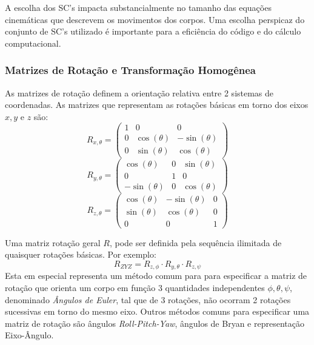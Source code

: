 A escolha dos SC's impacta substancialmente no tamanho das equações
cinemáticas que descrevem os movimentos dos corpos. Uma escolha perspicaz do conjunto de
SC's utilizado é importante para a eficiência do código e do cálculo
computacional.

\subsubsection{Matrizes de Rotação e Transformação Homogênea}

As matrizes de rotação definem a orientação relativa entre 2 sistemas de
coordenadas. As matrizes que representam as rotações básicas em torno
dos eixos $x, y$ e $z$ são: 
%
\begin{equation}
	R_{x,\theta} = 
\begin{pmatrix}
1 &0  &0 \\ 
0 &\cos(\theta)  &-\sin(\theta) \\ 
0 &\sin(\theta)  &\cos(\theta) 
\end{pmatrix}
\end{equation}
%
\begin{equation}
R_{y,\theta} = 
\begin{pmatrix}
\cos(\theta) &0  &\sin(\theta) \\ 
0 &1  &0 \\ 
-\sin(\theta) &0  &\cos(\theta) 
\end{pmatrix}
\end{equation}
%
\begin{equation}
R_{z,\theta} = 
\begin{pmatrix}
\cos(\theta) &-\sin(\theta)  &0 \\ 
\sin(\theta) &\cos(\theta)  &0 \\ 
0 &0  &1
\end{pmatrix}
\end{equation}
%

Uma matriz rotação geral $R$, pode ser definida pela sequência ilimitada de
quaisquer rotações básicas. Por exemplo:
%
\begin{equation}
	R_{ZYZ} = R_{z,\phi} \cdot R_{y,\theta} \cdot R_{z,\psi}
\end{equation}
%
Esta em especial representa um método comum para para especificar a matriz de
rotação que orienta um corpo em função 3 quantidades independentes $\phi, \theta, \psi$,
denominado \emph{Ângulos de Euler}, tal que de 3 rotações, não
ocorram 2 rotações sucessivas em torno do mesmo eixo.
Outros métodos comuns para especificar uma matriz de rotação são ângulos \textit{Roll-Pitch-Yaw}, ângulos de Bryan e
representação Eixo-Ângulo.

